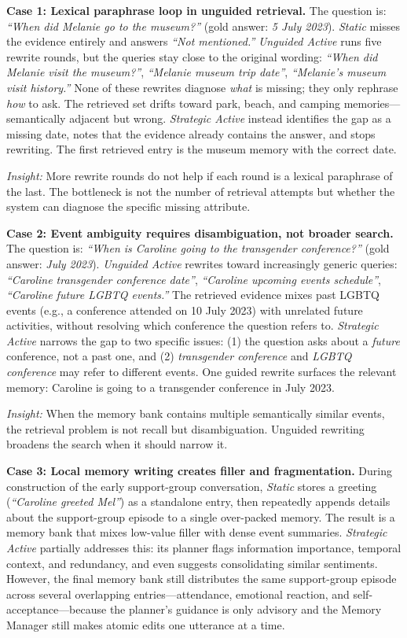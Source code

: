 \noindent\textbf{Case 1: Lexical paraphrase loop in unguided retrieval.}
The question is: \emph{``When did Melanie go to the museum?''} (gold answer: \emph{5 July 2023}).
\textit{Static} misses the evidence entirely and answers \emph{``Not mentioned.''}
\textit{Unguided Active} runs five rewrite rounds, but the queries stay close to the original wording: \emph{``When did Melanie visit the museum?''}, \emph{``Melanie museum trip date''}, \emph{``Melanie's museum visit history.''}
None of these rewrites diagnose \emph{what} is missing; they only rephrase \emph{how} to ask.
The retrieved set drifts toward park, beach, and camping memories---semantically adjacent but wrong.
\textit{Strategic Active} instead identifies the gap as a missing date, notes that the evidence already contains the answer, and stops rewriting.
The first retrieved entry is the museum memory with the correct date.

\emph{Insight:} More rewrite rounds do not help if each round is a lexical paraphrase of the last.
The bottleneck is not the number of retrieval attempts but whether the system can diagnose the specific missing attribute.

\noindent\textbf{Case 2: Event ambiguity requires disambiguation, not broader search.}
The question is: \emph{``When is Caroline going to the transgender conference?''} (gold answer: \emph{July 2023}).
\textit{Unguided Active} rewrites toward increasingly generic queries: \emph{``Caroline transgender conference date''}, \emph{``Caroline upcoming events schedule''}, \emph{``Caroline future LGBTQ events.''}
The retrieved evidence mixes past LGBTQ events (e.g., a conference attended on 10 July 2023) with unrelated future activities, without resolving which conference the question refers to.
\textit{Strategic Active} narrows the gap to two specific issues: (1) the question asks about a \emph{future} conference, not a past one, and (2) \emph{transgender conference} and \emph{LGBTQ conference} may refer to different events.
One guided rewrite surfaces the relevant memory: Caroline is going to a transgender conference in July 2023.

\emph{Insight:} When the memory bank contains multiple semantically similar events, the retrieval problem is not recall but disambiguation.
Unguided rewriting broadens the search when it should narrow it.

\noindent\textbf{Case 3: Local memory writing creates filler and fragmentation.}
During construction of the early support-group conversation, \textit{Static} stores a greeting (\emph{``Caroline greeted Mel''}) as a standalone entry, then repeatedly appends details about the support-group episode to a single over-packed memory.
The result is a memory bank that mixes low-value filler with dense event summaries.
\textit{Strategic Active} partially addresses this: its planner flags information importance, temporal context, and redundancy, and even suggests consolidating similar sentiments.
However, the final memory bank still distributes the same support-group episode across several overlapping entries---attendance, emotional reaction, and self-acceptance---because the planner's guidance is only advisory and the Memory Manager still makes atomic edits one utterance at a time.

